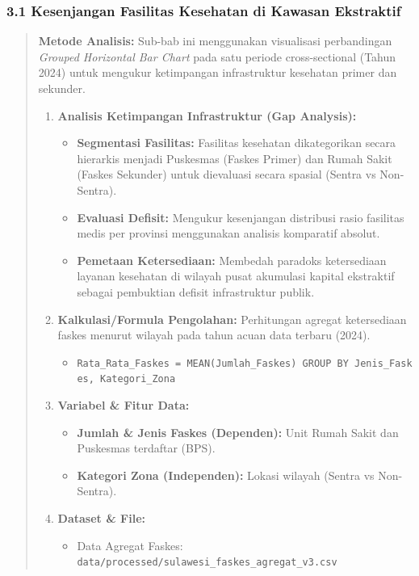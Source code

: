 \documentclass[
]{article}
\providecommand{\tightlist}{%
  \setlength{\itemsep}{0pt}\setlength{\parskip}{0pt}}
\begin{document}
\subsubsection{3.1 Kesenjangan Fasilitas Kesehatan di Kawasan
Ekstraktif}\label{kesenjangan-fasilitas-kesehatan-di-kawasan-ekstraktif}

\begin{quote}
\textbf{Metode Analisis:} Sub-bab ini menggunakan visualisasi
perbandingan \emph{Grouped Horizontal Bar Chart} pada satu periode
cross-sectional (Tahun 2024) untuk mengukur ketimpangan infrastruktur
kesehatan primer dan sekunder.

\begin{enumerate}
\def\labelenumi{\arabic{enumi}.}
\tightlist
\item
  \textbf{Analisis Ketimpangan Infrastruktur (Gap Analysis):}

  \begin{itemize}
  \tightlist
  \item
    \textbf{Segmentasi Fasilitas:} Fasilitas kesehatan dikategorikan
    secara hierarkis menjadi Puskesmas (Faskes Primer) dan Rumah Sakit
    (Faskes Sekunder) untuk dievaluasi secara spasial (Sentra vs
    Non-Sentra).
  \item
    \textbf{Evaluasi Defisit:} Mengukur kesenjangan distribusi rasio
    fasilitas medis per provinsi menggunakan analisis komparatif
    absolut.
  \item
    \textbf{Pemetaan Ketersediaan:} Membedah paradoks ketersediaan
    layanan kesehatan di wilayah pusat akumulasi kapital ekstraktif
    sebagai pembuktian defisit infrastruktur publik.
  \end{itemize}
\item
  \textbf{Kalkulasi/Formula Pengolahan:} Perhitungan agregat
  ketersediaan faskes menurut wilayah pada tahun acuan data terbaru
  (2024).

  \begin{itemize}
  \tightlist
  \item
    \texttt{Rata\_Rata\_Faskes\ =\ MEAN(Jumlah\_Faskes)\ GROUP\ BY\ Jenis\_Faskes,\ Kategori\_Zona}
  \end{itemize}
\item
  \textbf{Variabel \& Fitur Data:}

  \begin{itemize}
  \tightlist
  \item
    \textbf{Jumlah \& Jenis Faskes (Dependen):} Unit Rumah Sakit dan
    Puskesmas terdaftar (BPS).
  \item
    \textbf{Kategori Zona (Independen):} Lokasi wilayah (Sentra vs
    Non-Sentra).
  \end{itemize}
\item
  \textbf{Dataset \& File:}

  \begin{itemize}
  \tightlist
  \item
    Data Agregat Faskes:
    \texttt{data/processed/sulawesi\_faskes\_agregat\_v3.csv}
  \end{itemize}
\end{enumerate}
\end{quote}
\end{document}
